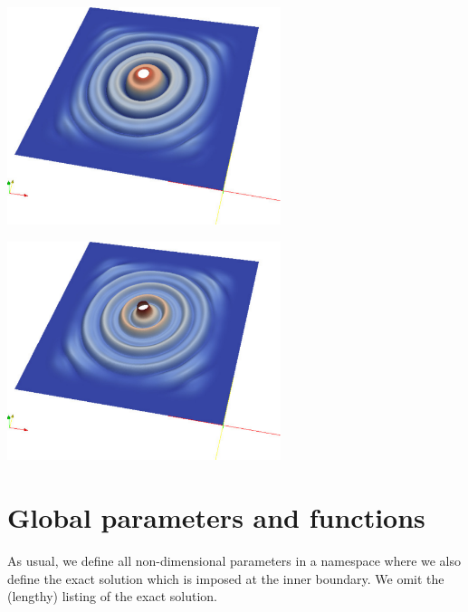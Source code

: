  
\begin{DoxyImage}
\includegraphics[width=0.6\textwidth]{result3}
\end{DoxyImage}


 
\begin{DoxyImage}
\includegraphics[width=0.6\textwidth]{result4}
\end{DoxyImage}




 

\hypertarget{index_namespace}{}\section{Global parameters and functions}\label{index_namespace}
As usual, we define all non-\/dimensional parameters in a namespace where we also define the exact solution which is imposed at the inner boundary. We omit the (lengthy) listing of the exact solution.

